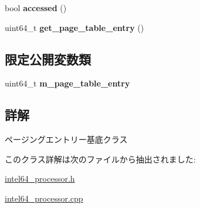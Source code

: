 \begin{DoxyCompactItemize}
\item 
\hypertarget{classintel64__page__entry__base_a80d246aec4d6179761a2a696feb647b6}{}bool {\bfseries accessed} ()\label{classintel64__page__entry__base_a80d246aec4d6179761a2a696feb647b6}

\item 
\hypertarget{classintel64__page__entry__base_af29247f033cfcf35ed36abaa219f3291}{}uint64\+\_\+t {\bfseries get\+\_\+page\+\_\+table\+\_\+entry} ()\label{classintel64__page__entry__base_af29247f033cfcf35ed36abaa219f3291}

\end{DoxyCompactItemize}
\subsection*{限定公開変数類}
\begin{DoxyCompactItemize}
\item 
\hypertarget{classintel64__page__entry__base_aeee035802da3fec6c99576bbaa76e9a0}{}uint64\+\_\+t {\bfseries m\+\_\+page\+\_\+table\+\_\+entry}\label{classintel64__page__entry__base_aeee035802da3fec6c99576bbaa76e9a0}

\end{DoxyCompactItemize}


\subsection{詳解}
ページングエントリー基底クラス 

このクラス詳解は次のファイルから抽出されました\+:\begin{DoxyCompactItemize}
\item 
\hyperlink{intel64__processor_8h}{intel64\+\_\+processor.\+h}\item 
\hyperlink{intel64__processor_8cpp}{intel64\+\_\+processor.\+cpp}\end{DoxyCompactItemize}
